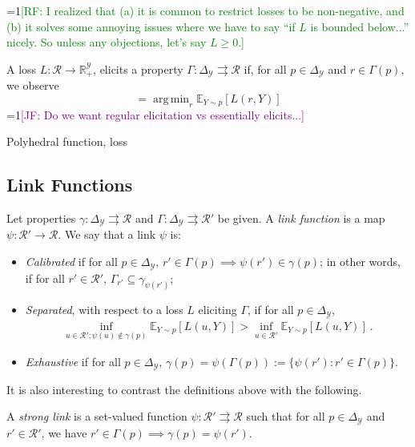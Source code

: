 \documentclass[11pt]{colt2019}
\newcommand{\Comments}{1}
\newcommand{\mynote}[2]{\ifnum\Comments=1\textcolor{#1}{#2}\fi}
\newcommand{\raf}[1]{\mynote{green}{[RF: #1]}}
\newcommand{\jessie}[1]{\mynote{purple}{[JF: #1]}}
\newcommand{\reals}{\mathbb{R}}
\newcommand{\simplex}{\Delta_\Y}
\newcommand{\E}{\mathbb{E}}
\newcommand{\R}{\mathcal{R}}
\newcommand{\Y}{\mathcal{Y}}
\newcommand{\toto}{\rightrightarrows}
\DeclareMathOperator*{\argmin}{arg\,min}
\begin{document}
\begin{definition}
  \raf{I realized that (a) it is common to restrict losses to be non-negative, and (b) it solves some annoying issues where we have to say ``if $L$ is bounded below...'' nicely.  So unless any objections, let's say $L \geq 0$.}
  
  A loss $L:\R\to\reals^\Y_+$, elicits a property $\Gamma:\simplex \toto \R$ if, for all $p \in \simplex$ and $r \in \Gamma(p)$, we observe
  \begin{equation}
   = \argmin_r \E_{Y\sim p}[L(r,Y)]
  \end{equation}
  \jessie{Do we want regular elicitation vs essentially elicits...}
\end{definition}

\begin{definition}
  Polyhedral function, loss
\end{definition}

\subsection{Link Functions}

\begin{definition}
  Let properties $\gamma:\simplex\toto\R$ and $\Gamma:\simplex\toto\R'$ be given.
  A \emph{link function} is a map $\psi:\R'\to\R$.
  We say that a link $\psi$ is:
  \begin{itemize}
  \item \emph{Calibrated} if for all $p\in\simplex$, $r'\in \Gamma(p) \implies \psi(r') \in \gamma(p)$; in other words, if for all $r'\in\R'$, $\Gamma_{r'} \subseteq \gamma_{\psi(r')}$;
  \item \emph{Separated}, with respect to a loss $L$ eliciting $\Gamma$, if for all $p \in \simplex$, 
  \begin{align*}
  \inf_{u \in \R'; \psi(u) \not \in \gamma(p)} \E_{Y\sim p}[L(u, Y)] > \inf_{u \in \R'}\E_{Y\sim p}[L(u, Y)]~.
  \end{align*}
  \item \emph{Exhaustive} if for all $p\in\simplex$, $\gamma(p) = \psi(\Gamma(p)) := \{\psi(r') : r'\in\Gamma(p)\}$.
  \end{itemize}
\end{definition}

It is also interesting to contrast the definitions above with the following.
\begin{definition}
  A \emph{strong link} is a set-valued function $\psi:\R'\toto\R$ such that for all $p\in\simplex$ and $r'\in\R'$, we have $r'\in\Gamma(p) \implies \gamma(p) = \psi(r')$.
\end{definition}
\end{document}

